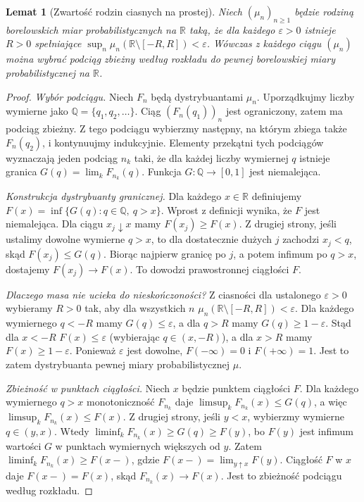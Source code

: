 \documentclass[11pt,a4paper,oneside]{report}
\numberwithin{equation}{chapter}
\theoremstyle{plain}
\newtheorem{lemat}[twierdzenie]{Lemat}
\theoremstyle{definition}
\theoremstyle{remark}
\newcommand{\R}{\mathbb{R}}
\begin{document}
\begin{lemat}[Zwartość rodzin ciasnych na prostej]
Niech $(\mu_n)_{n\geq1}$ będzie rodziną borelowskich miar
probabilistycznych na $\R$ taką, że dla każdego
$\varepsilon>0$ istnieje $R>0$ spełniające
$\sup_n\mu_n(\R\setminus[-R,R])<\varepsilon$.
Wówczas z każdego ciągu $(\mu_n)$ można wybrać
podciąg zbieżny według rozkładu do pewnej borelowskiej
miary probabilistycznej na $\R$.
\end{lemat}
\begin{proof}
\emph{Wybór podciągu.} Niech $F_n$ będą dystrybuantami
$\mu_n$. Uporządkujmy liczby wymierne jako
$\mathbb Q=\{q_1,q_2,\ldots\}$. Ciąg
$(F_n(q_1))_n$ jest ograniczony, zatem ma podciąg
zbieżny. Z tego podciągu wybierzmy następny, na którym
zbiega także $F_n(q_2)$, i kontynuujmy indukcyjnie.
Elementy przekątni tych podciągów wyznaczają jeden
podciąg $n_k$ taki, że dla każdej liczby wymiernej
$q$ istnieje granica $G(q)=\lim_kF_{n_k}(q)$.
Funkcja $G:\mathbb Q\to[0,1]$ jest niemalejąca.

\emph{Konstrukcja dystrybuanty granicznej.}
Dla każdego $x\in\R$ definiujemy
$F(x)=\inf\{G(q):q\in\mathbb Q,\ q>x\}$.
Wprost z definicji wynika, że $F$ jest niemalejąca.
Dla ciągu $x_j\downarrow x$ mamy $F(x_j)\geq F(x)$.
Z drugiej strony, jeśli ustalimy dowolne wymierne
$q>x$, to dla dostatecznie dużych $j$ zachodzi
$x_j<q$, skąd $F(x_j)\leq G(q)$. Biorąc najpierw
granicę po $j$, a potem infimum po $q>x$,
dostajemy $F(x_j)\to F(x)$. To dowodzi
prawostronnej ciągłości $F$.

\emph{Dlaczego masa nie ucieka do nieskończoności?}
Z ciasności dla ustalonego $\varepsilon>0$
wybieramy $R>0$ tak, aby dla wszystkich $n$
$\mu_n(\R\setminus[-R,R])<\varepsilon$.
Dla każdego wymiernego $q<-R$ mamy
$G(q)\leq\varepsilon$, a dla $q>R$ mamy
$G(q)\geq1-\varepsilon$. Stąd dla $x<-R$
$F(x)\leq\varepsilon$ (wybierając $q\in(x,-R)$),
a dla $x>R$ mamy $F(x)\geq1-\varepsilon$.
Ponieważ $\varepsilon$ jest dowolne,
$F(-\infty)=0$ i $F(+\infty)=1$.
Jest to zatem dystrybuanta pewnej miary
probabilistycznej $\mu$.

\emph{Zbieżność w punktach ciągłości.}
Niech $x$ będzie punktem ciągłości $F$.
Dla każdego wymiernego $q>x$ monotoniczność
$F_{n_k}$ daje
$\limsup_kF_{n_k}(x)\leq G(q)$, a więc
$\limsup_kF_{n_k}(x)\leq F(x)$.
Z drugiej strony, jeśli $y<x$, wybierzmy
wymierne $q\in(y,x)$. Wtedy
$\liminf_kF_{n_k}(x)\geq G(q)\geq F(y)$,
bo $F(y)$ jest infimum wartości $G$ w punktach
wymiernych większych od $y$. Zatem
$\liminf_kF_{n_k}(x)\geq F(x-)$, gdzie
$F(x-)=\lim_{y\uparrow x}F(y)$.
Ciągłość $F$ w $x$ daje $F(x-)=F(x)$, skąd
$F_{n_k}(x)\to F(x)$. Jest to zbieżność
podciągu według rozkładu.
\end{proof}
\end{document}
